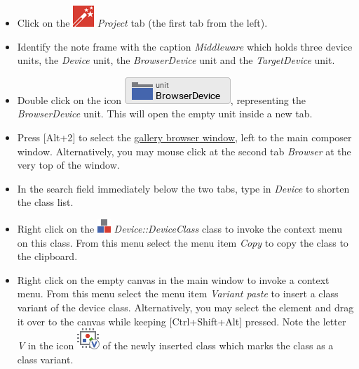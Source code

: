 \documentclass[
  a4paper,
,tablecaptionabove
]{scrbook}
\begin{document}
\begin{itemize}
\item
  Click on the
  \includegraphics{./../asciidoc/modules/ROOT/assets/images/icons/EmbeddedWizardIcon.png}
  \emph{Project} tab (the first tab from the left).
\item
  Identify the note frame with the caption \emph{Middleware} which holds
  three device units, the \emph{Device} unit, the \emph{BrowserDevice}
  unit and the \emph{TargetDevice} unit.
\item
  Double click on the icon
  \includegraphics{./../asciidoc/modules/ROOT/assets/images/icons/BrowserDeviceUnitIcon.png},
  representing the \emph{BrowserDevice} unit. This will open the empty
  unit inside a new tab.
\item
  Press {[}Alt+2{]} to select the
  \href{https://doc.embedded-wizard.de/gallery-browser-window}{gallery
  browser window}, left to the main composer window. Alternatively, you
  may mouse click at the second tab \emph{Browser} at the very top of
  the window.
\item
  In the search field immediately below the two tabs, type in
  \emph{Device} to shorten the class list.
\item
  Right click on the
  \includegraphics{./../asciidoc/modules/ROOT/assets/images/icons/ClassIcon.png}
  \emph{Device::DeviceClass} class to invoke the context menu on this
  class. From this menu select the menu item \emph{Copy} to copy the
  class to the clipboard.
\item
  Right click on the empty canvas in the main window to invoke a context
  menu. From this menu select the menu item \emph{Variant paste} to
  insert a class variant of the device class. Alternatively, you may
  select the element and drag it over to the canvas while keeping
  {[}Ctrl+Shift+Alt{]} pressed. Note the letter \emph{V} in the icon
  \includegraphics{./../asciidoc/modules/ROOT/assets/images/icons/VariantClassIcon.png}
  of the newly inserted class which marks the class as a class variant.

\end{itemize}
\end{document}
